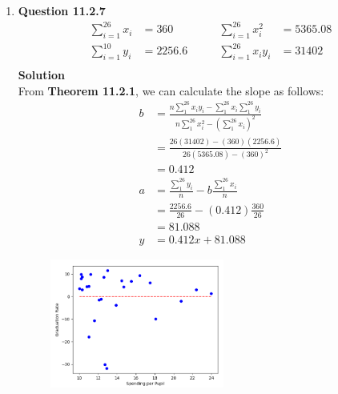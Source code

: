 \documentclass{uofa-eng-assignment}
\begin{document}
\begin{enumerate}
    \item[]
        \textbf{Question 11.2.7}
        \begin{align*}
            \sum_{i=1}^{26}x_i & = 360 \qquad    & \sum_{i=1}^{26}x_i^2  & = 5365.08 \\
            \sum_{i=1}^{10}y_i & = 2256.6 \qquad & \sum_{i=1}^{26}x_iy_i & = 31402   \\
        \end{align*}
        \textbf{Solution} \\
        From \textbf{Theorem 11.2.1}, we can calculate the slope as follows:
        \begin{align*}
            b & = \frac{n\sum_{1}^{26}x_iy_i - \sum_{1}^{26}x_i\sum_{1}^{26}y_i}{n\sum_{1}^{26}x_i^2 - (\sum_{1}^{26}x_i)^2} \\
              & = \frac{26(31402) - (360)(2256.6)}{26(5365.08) - (360)^2}                                                    \\
              & = 0.412                                                                                                      \\
            a & = \frac{\sum_{1}^{26}y_i}{n} - b\frac{\sum_{1}^{26}x_i}{n}                                                   \\
              & = \frac{2256.6}{26} - (0.412)\frac{360}{26}                                                                  \\
              & = 81.088                                                                                                     \\
            y & = 0.412x + 81.088
        \end{align*}
        \begin{figure}[h]
            \centering
            \includegraphics[width=0.54\textwidth]{11.2.7.png}
        \end{figure}

\end{enumerate}
\end{document}
